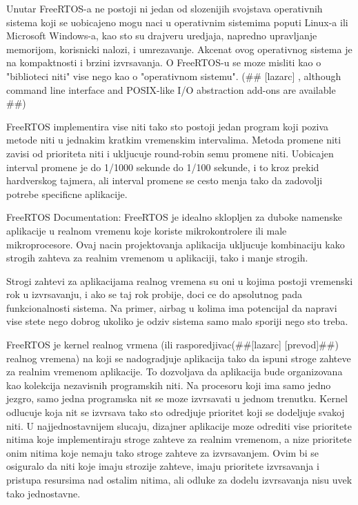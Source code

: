 \documentclass[a4paper,12pt, master]{etf}
\begin{document}
	Unutar FreeRTOS-a ne postoji ni jedan od slozenijih svojstava operativnih sistema koji se
	uobicajeno mogu naci u operativnim sistemima poputi Linux-a ili Microsoft Windows-a, kao 
	sto su drajveru uredjaja, napredno upravljanje memorijom, korisnicki nalozi, i 
	umrezavanje. Akcenat ovog operativnog sistema je na kompaktnosti i brzini izvrsavanja. O 
	FreeRTOS-u se moze misliti kao o "biblioteci niti" vise nego kao o "operativnom sistemu". 
	(\#\# [lazarc] , although command line interface and POSIX-like I/O abstraction add-ons 
	are available \#\#)

	FreeRTOS implementira vise niti tako sto postoji jedan program koji poziva metode niti u
	jednakim kratkim vremenskim intervalima. Metoda promene niti zavisi od prioriteta niti i
	ukljucuje round-robin semu promene niti. Uobicajen interval promene je do 1/1000 sekunde do
	1/100 sekunde, i to kroz prekid hardverskog tajmera, ali interval promene se cesto menja 
	tako da zadovolji potrebe specificne aplikacije.

	FreeRTOS Documentation:
	FreeRTOS je idealno sklopljen za duboke namenske aplikacije u realnom vremenu koje koriste
	mikrokontrolere ili male mikroprocesore. Ovaj nacin projektovanja aplikacija ukljucuje
	kombinaciju kako strogih zahteva za realnim vremenom u aplikaciji, tako i manje strogih.

	Strogi zahtevi za aplikacijama realnog vremena su oni u kojima postoji vremenski rok u
	izvrsavanju, i ako se taj rok probije, doci ce do apsolutnog pada funkcionalnosti sistema. 
	Na primer, airbag u kolima ima potencijal da napravi vise stete nego dobrog ukoliko je 
	odziv sistema samo malo sporiji nego sto treba.

	FreeRTOS je kernel realnog vrmena (ili rasporedjivac(\#\#[lazarc] [prevod]\#\#) realnog 
	vremena) na	koji se nadogradjuje aplikacija tako da ispuni stroge zahteve za realnim 
	vremenom aplikacije. To dozvoljava da aplikacija bude organizovana kao kolekcija 
	nezavisnih programskih niti. Na	procesoru koji ima samo jedno jezgro, samo jedna 
	programska nit se moze izvrsavati u jednom trenutku. Kernel odlucuje koja nit se izvrsava 
	tako sto odredjuje prioritet koji se dodeljuje svakoj niti. U najjednostavnijem slucaju, 
	dizajner aplikacije moze odrediti vise prioritete nitima koje implementiraju stroge 
	zahteve za realnim vremenom, a nize prioritete onim nitima koje nemaju tako stroge zahteve 
	za izvrsavanjem. Ovim bi se osiguralo da niti koje imaju strozije zahteve, imaju 
	prioritete izvrsavanja i pristupa resursima nad ostalim nitima, ali odluke za dodelu 
	izvrsavanja nisu uvek tako jednostavne.
\end{document}
